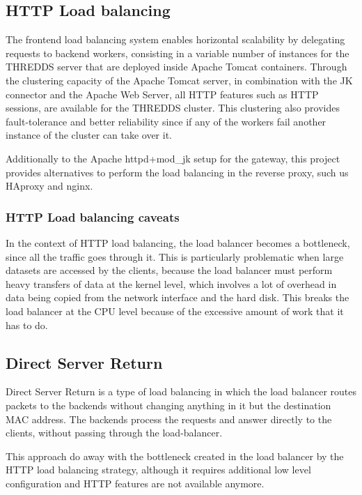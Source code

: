 \documentclass[a4paper,12pt]{article}
\begin{document}
\subsection{HTTP Load balancing}

The frontend load balancing system enables horizontal scalability by delegating requests to backend workers, consisting in a variable number of instances for the THREDDS server that are deployed inside Apache Tomcat containers. Through the clustering capacity of the Apache Tomcat server, in combination with the JK connector and the Apache Web Server, all HTTP features such as HTTP sessions, are available for the THREDDS cluster. This clustering also provides fault-tolerance and better reliability since if any of the workers fail another instance of the cluster can take over it.

Additionally to the Apache httpd+mod\_jk setup for the gateway, this project provides alternatives to perform the load balancing in the reverse proxy, such us HAproxy and nginx.

\subsubsection{HTTP Load balancing caveats}

In the context of HTTP load balancing, the load balancer becomes a bottleneck, since all the traffic goes through it. This is particularly problematic when large datasets are accessed by the clients, because the load balancer must perform heavy transfers of data at the kernel level, which involves a lot of overhead in data being copied from the network interface and the hard disk. This breaks the load balancer at the CPU level because of the excessive amount of work that it has to do.

\subsection{Direct Server Return}

Direct Server Return is a type of load balancing in which the load balancer routes packets to the backends without changing anything in it but the destination MAC address. The backends process the requests and answer directly to the clients, without passing through the load-balancer.

This approach do away with the bottleneck created in the load balancer by the HTTP load balancing strategy, although it requires additional low level configuration and HTTP features are not available anymore.
\end{document}
